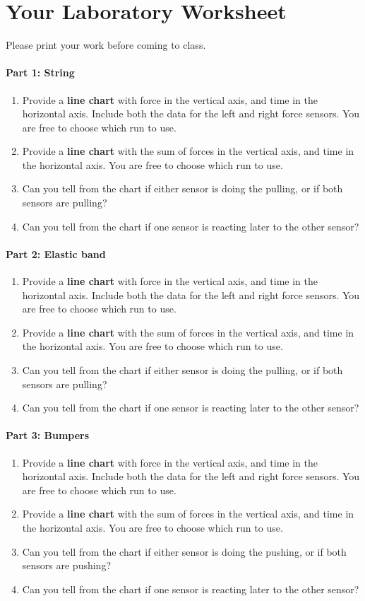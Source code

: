 \section{Your Laboratory Worksheet}
%
Please print your work before coming to class.
%
\paragraph{Part 1: String}
%
\begin{enumerate}
    \item Provide a \textbf{line chart} with force in the vertical axis, and time in the horizontal axis. Include both the data for the left and right force sensors. You are free to choose which run to use.
    \item Provide a \textbf{line chart} with the sum of forces in the vertical axis, and time in the horizontal axis. You are free to choose which run to use.
    \item Can you tell from the chart if either sensor is doing the pulling, or if both sensors are pulling?
    \item Can you tell from the chart if one sensor is reacting later to the other sensor?
\end{enumerate}
%
\paragraph{Part 2: Elastic band}
%
\begin{enumerate}
    \item Provide a \textbf{line chart} with force in the vertical axis, and time in the horizontal axis. Include both the data for the left and right force sensors. You are free to choose which run to use.
    \item Provide a \textbf{line chart} with the sum of forces in the vertical axis, and time in the horizontal axis. You are free to choose which run to use.
    \item Can you tell from the chart if either sensor is doing the pulling, or if both sensors are pulling?
    \item Can you tell from the chart if one sensor is reacting later to the other sensor?
\end{enumerate}
%
\paragraph{Part 3: Bumpers}
%
\begin{enumerate}
    \item Provide a \textbf{line chart} with force in the vertical axis, and time in the horizontal axis. Include both the data for the left and right force sensors. You are free to choose which run to use.
    \item Provide a \textbf{line chart} with the sum of forces in the vertical axis, and time in the horizontal axis. You are free to choose which run to use.
    \item Can you tell from the chart if either sensor is doing the pushing, or if both sensors are pushing?
    \item Can you tell from the chart if one sensor is reacting later to the other sensor?
\end{enumerate}
%
